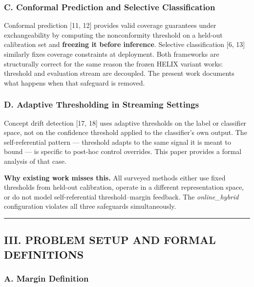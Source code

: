 \documentclass[
  conference]{IEEEtran}
\begin{document}
\subsubsection{C. Conformal Prediction and Selective
Classification}\label{c.-conformal-prediction-and-selective-classification}

Conformal prediction {[}11, 12{]} provides valid coverage guarantees
under exchangeability by computing the nonconformity threshold on a
held-out calibration set and \textbf{freezing it before inference}.
Selective classification {[}6, 13{]} similarly fixes coverage
constraints at deployment. Both frameworks are structurally correct for
the same reason the frozen HELIX variant works: threshold and evaluation
stream are decoupled. The present work documents what happens when that
safeguard is removed.

\subsubsection{D. Adaptive Thresholding in Streaming
Settings}\label{d.-adaptive-thresholding-in-streaming-settings}

Concept drift detection {[}17, 18{]} uses adaptive thresholds on the
label or classifier space, not on the confidence threshold applied to
the classifier's own output. The self-referential pattern --- threshold
adapts to the same signal it is meant to bound --- is specific to
post-hoc control overrides. This paper provides a formal analysis of
that case.

\textbf{Why existing work misses this.} All surveyed methods either use
fixed thresholds from held-out calibration, operate in a different
representation space, or do not model self-referential threshold--margin
feedback. The \emph{online\_hybrid} configuration violates all three
safeguards simultaneously.

\begin{center}\rule{0.5\linewidth}{0.5pt}\end{center}

\subsection{III. PROBLEM SETUP AND FORMAL
DEFINITIONS}\label{iii.-problem-setup-and-formal-definitions}

\subsubsection{A. Margin Definition}\label{a.-margin-definition}
\end{document}
